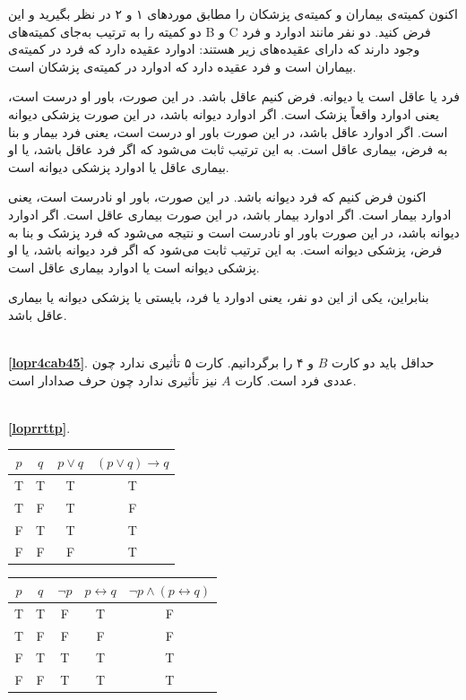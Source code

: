 اکنون کمیته‌ی بیماران و کمیته‌ی پزشکان را مطابق موردهای ۱ و ۲ در نظر بگیرید و این دو کمیته را به ترتیب به‌جای کمیته‌های B و C فرض کنید. ‌دو نفر مانند ادوارد و فرد وجود دارند که دارای عقیده‌های زیر هستند: ادوارد عقیده دارد که فرد در کمیته‌ی بیماران است و فرد عقیده دارد که ادوارد در کمیته‌ی پزشکان است.

فرد یا عاقل است یا دیوانه. فرض کنیم عاقل باشد. در این صورت، باور او درست است، یعنی ادوارد واقعاً پزشک است. اگر ادوارد دیوانه باشد، در این صورت پزشکی دیوانه است. اگر ادوارد عاقل باشد، در این صورت باور او درست است، یعنی فرد بیمار و بنا به فرض، بیماری عاقل است. به این ترتیب ثابت می‌شود که اگر فرد عاقل باشد، یا او بیماری عاقل یا ادوارد پزشکی دیوانه است.

اکنون فرض کنیم که فرد دیوانه باشد. در این صورت، باور او نادرست است، یعنی ادوارد بیمار است. اگر ادوارد بیمار باشد، در این صورت بیماری عاقل است. اگر ادوارد دیوانه باشد، در این صورت باور او نادرست است و نتیجه می‌شود که فرد پزشک و بنا به فرض، پزشکی دیوانه است. به این ترتیب ثابت می‌شود که اگر فرد دیوانه باشد، یا او پزشکی دیوانه است یا ادوارد بیماری عاقل است.

بنابراین، یکی از این دو نفر، یعنی ادوارد یا فرد، بایستی یا پزشکی دیوانه یا بیماری عاقل باشد.

\df \\ \textbf{\ref{lopr4cab45}}.
حداقل باید دو کارت $B$ و ۴ را برگردانیم. کارت ۵ تأثیری ندارد چون عددی فرد است. کارت $A$ نیز تأثیری ندارد چون حرف صدادار است.

\df \\ \textbf{\ref{loprrttp}}.
\begin{table}[H]
	\begin{latin}
		\centering
		\begin{tabular}{c|c|c|c}
			$p$ & $q$ & $p \vee q$ & $(p \vee q) \rightarrow q$ \\
			\hline
			T & T & T & T \\
			T & F & T & F \\
			F & T & T & T \\
			F & F & F & T 
		\end{tabular}
		\qquad \qquad
		\begin{tabular}{c|c|c|c|c}
			$p$ & $q$ & $\neg p$ & $p \leftrightarrow q$ & $\neg p \wedge (p \leftrightarrow q)$ \\
			\hline
			T & T & F & T & F \\
			T & F & F & F & F \\
			F & T & T & T & T \\
			F & F & T & T & T
		\end{tabular}
	\end{latin}
\end{table}

